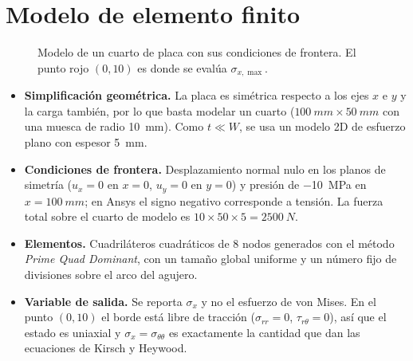 \documentclass[11pt,letterpaper]{article}
\begin{document}
\section{Modelo de elemento finito}
\begin{figure}[h]
\centering
{}
\caption{Modelo de un cuarto de placa con sus condiciones de frontera. El punto rojo $(0,10)$ es donde se evalúa $\sigma_{x,\max}$.}
\label{fig:modelo}
\end{figure}
\begin{itemize}
\item \textbf{Simplificación geométrica.} La placa es simétrica respecto a los ejes $x$ e $y$ y la carga también, por lo que basta modelar un cuarto ($\SI{100}{mm}\times\SI{50}{mm}$ con una muesca de radio \SI{10}{mm}). Como $t\ll W$, se usa un modelo 2D de esfuerzo plano con espesor \SI{5}{mm}.
\item \textbf{Condiciones de frontera.} Desplazamiento normal nulo en los planos de simetría ($u_x=0$ en $x=0$, $u_y=0$ en $y=0$) y presión de \SI{-10}{MPa} en $x=\SI{100}{mm}$; en Ansys el signo negativo corresponde a tensión. La fuerza total sobre el cuarto de modelo es $10\times50\times5=\SI{2500}{N}$.
\item \textbf{Elementos.} Cuadriláteros cuadráticos de 8 nodos generados con el método \emph{Prime Quad Dominant}, con un tamaño global uniforme y un número fijo de divisiones sobre el arco del agujero.
\item \textbf{Variable de salida.} Se reporta $\sigma_x$ y no el esfuerzo de von Mises. En el punto $(0,10)$ el borde está libre de tracción ($\sigma_{rr}=0$, $\tau_{r\theta}=0$), así que el estado es uniaxial y $\sigma_x=\sigma_{\theta\theta}$ es exactamente la cantidad que dan las ecuaciones de Kirsch y Heywood.
\end{itemize}
\end{document}

